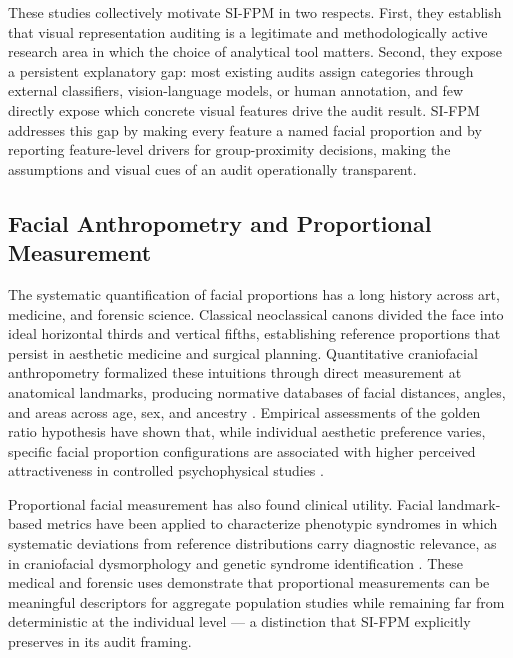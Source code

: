 \documentclass{article}
\begin{document}
These studies collectively motivate SI-FPM in two respects. First, they establish that visual representation auditing is a legitimate and methodologically active research area in which the choice of analytical tool matters. Second, they expose a persistent explanatory gap: most existing audits assign categories through external classifiers, vision-language models, or human annotation, and few directly expose which concrete visual features drive the audit result. SI-FPM addresses this gap by making every feature a named facial proportion and by reporting feature-level drivers for group-proximity decisions, making the assumptions and visual cues of an audit operationally transparent.

\subsection{Facial Anthropometry and Proportional Measurement}

The systematic quantification of facial proportions has a long history across art, medicine, and forensic science. Classical neoclassical canons divided the face into ideal horizontal thirds and vertical fifths, establishing reference proportions that persist in aesthetic medicine and surgical planning. Quantitative craniofacial anthropometry formalized these intuitions through direct measurement at anatomical landmarks, producing normative databases of facial distances, angles, and areas across age, sex, and ancestry \cite{farkas1994anthropometry}. Empirical assessments of the golden ratio hypothesis have shown that, while individual aesthetic preference varies, specific facial proportion configurations are associated with higher perceived attractiveness in controlled psychophysical studies \cite{pallett2010golden}.

Proportional facial measurement has also found clinical utility. Facial landmark-based metrics have been applied to characterize phenotypic syndromes in which systematic deviations from reference distributions carry diagnostic relevance, as in craniofacial dysmorphology and genetic syndrome identification \cite{hammond2007dysmorphology,gurovich2019predicting}. These medical and forensic uses demonstrate that proportional measurements can be meaningful descriptors for aggregate population studies while remaining far from deterministic at the individual level — a distinction that SI-FPM explicitly preserves in its audit framing.
\end{document}
